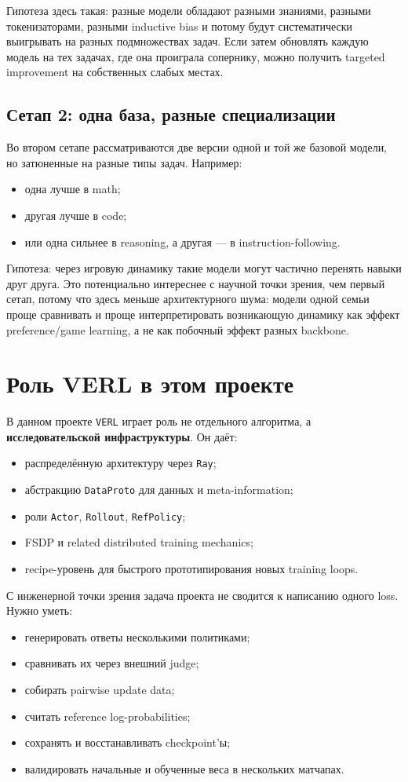 \documentclass[11pt,a4paper]{article}
\begin{document}
Гипотеза здесь такая: разные модели обладают разными знаниями, разными токенизаторами, разными inductive bias и потому будут систематически выигрывать на разных подмножествах задач. Если затем обновлять каждую модель на тех задачах, где она проиграла сопернику, можно получить targeted improvement на собственных слабых местах.

\subsection{Сетап 2: одна база, разные специализации}

Во втором сетапе рассматриваются две версии одной и той же базовой модели, но затюненные на разные типы задач. Например:
\begin{itemize}
  \item одна лучше в math;
  \item другая лучше в code;
  \item или одна сильнее в reasoning, а другая --- в instruction-following.
\end{itemize}

Гипотеза: через игровую динамику такие модели могут частично перенять навыки друг друга. Это потенциально интереснее с научной точки зрения, чем первый сетап, потому что здесь меньше архитектурного шума: модели одной семьи проще сравнивать и проще интерпретировать возникающую динамику как эффект preference/game learning, а не как побочный эффект разных backbone.

\section{Роль VERL в этом проекте}

В данном проекте \texttt{VERL} играет роль не отдельного алгоритма, а \textbf{исследовательской инфраструктуры}. Он даёт:
\begin{itemize}
  \item распределённую архитектуру через \texttt{Ray};
  \item абстракцию \texttt{DataProto} для данных и meta-information;
  \item роли \texttt{Actor}, \texttt{Rollout}, \texttt{RefPolicy};
  \item FSDP и related distributed training mechanics;
  \item recipe-уровень для быстрого прототипирования новых training loops.
\end{itemize}

С инженерной точки зрения задача проекта не сводится к написанию одного loss. Нужно уметь:
\begin{itemize}
  \item генерировать ответы несколькими политиками;
  \item сравнивать их через внешний judge;
  \item собирать pairwise update data;
  \item считать reference log-probabilities;
  \item сохранять и восстанавливать checkpoint'ы;
  \item валидировать начальные и обученные веса в нескольких матчапах.
\end{itemize}
\end{document}
